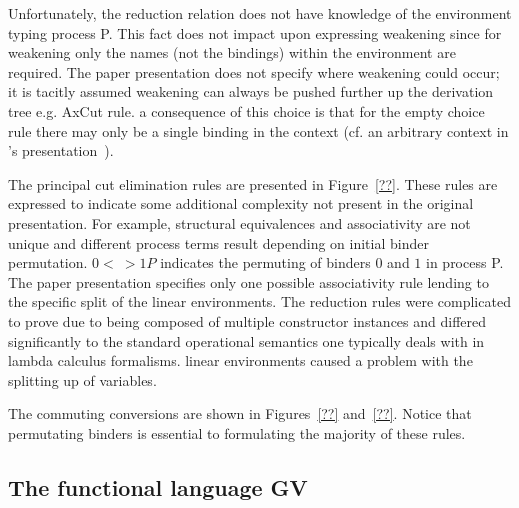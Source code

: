 
Unfortunately, the reduction relation does not have knowledge of the
environment typing process P. This fact does not impact upon expressing
weakening since for weakening only the names (not the bindings) within the
environment are required. The paper presentation does not specify where
weakening could occur; it is tacitly assumed weakening can always be pushed
further up the derivation tree e.g. AxCut rule. a consequence of this choice
is that for the empty choice rule there may only be a single binding in the
context (cf. an arbitrary context in \citeauthor{Wadler:2014}'s
presentation~\cite{Wadler:2014}).




The principal cut elimination rules are presented in Figure~\ref{??}. These
rules are expressed to indicate some additional complexity not present in the
original presentation. For example, structural equivalences and associativity
are not unique and different process terms result depending on initial binder
permutation. ${0 <~> 1}P$ indicates the permuting of binders $0$ and $1$ in
process P. The paper presentation specifies only one possible associativity
rule lending to the specific split of the linear environments. The reduction
rules were complicated to prove due to being composed of multiple constructor
instances and differed significantly to the standard operational semantics one
typically deals with in lambda calculus formalisms.
linear environments caused a problem with the splitting up of variables.






The commuting conversions are shown in Figures~\ref{??} and~\ref{??}. Notice
that permutating binders is essential to formulating the majority of these
rules.


\subsection{The functional language GV}\label{sec:gv}

\begin{comment}
FIGURES

types

terms
\end{comment}

